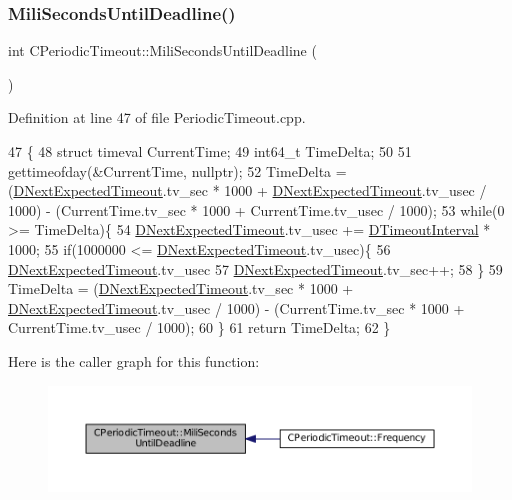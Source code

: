 \subsubsection{\texorpdfstring{Mili\+Seconds\+Until\+Deadline()}{MiliSecondsUntilDeadline()}}
{\footnotesize\ttfamily int C\+Periodic\+Timeout\+::\+Mili\+Seconds\+Until\+Deadline (\begin{DoxyParamCaption}{ }\end{DoxyParamCaption})}



Definition at line 47 of file Periodic\+Timeout.\+cpp.


\begin{DoxyCode}
47                                               \{
48     \textcolor{keyword}{struct }timeval CurrentTime;
49     int64\_t TimeDelta;
50     
51     gettimeofday(&CurrentTime, \textcolor{keyword}{nullptr});
52     TimeDelta = (\hyperlink{classCPeriodicTimeout_ae85c3dd7526ee6b538b7c6478133013c}{DNextExpectedTimeout}.tv\_sec * 1000 + 
      \hyperlink{classCPeriodicTimeout_ae85c3dd7526ee6b538b7c6478133013c}{DNextExpectedTimeout}.tv\_usec / 1000) - (CurrentTime.tv\_sec * 1000 + CurrentTime.tv\_usec
       / 1000);
53     \textcolor{keywordflow}{while}(0 >= TimeDelta)\{
54         \hyperlink{classCPeriodicTimeout_ae85c3dd7526ee6b538b7c6478133013c}{DNextExpectedTimeout}.tv\_usec += \hyperlink{classCPeriodicTimeout_ab0c2b821c02366c9638a66eced3c1f34}{DTimeoutInterval} * 1000;
55         \textcolor{keywordflow}{if}(1000000 <= \hyperlink{classCPeriodicTimeout_ae85c3dd7526ee6b538b7c6478133013c}{DNextExpectedTimeout}.tv\_usec)\{
56             \hyperlink{classCPeriodicTimeout_ae85c3dd7526ee6b538b7c6478133013c}{DNextExpectedTimeout}.tv\_usec %
57             \hyperlink{classCPeriodicTimeout_ae85c3dd7526ee6b538b7c6478133013c}{DNextExpectedTimeout}.tv\_sec++;
58         \}
59         TimeDelta = (\hyperlink{classCPeriodicTimeout_ae85c3dd7526ee6b538b7c6478133013c}{DNextExpectedTimeout}.tv\_sec * 1000 + 
      \hyperlink{classCPeriodicTimeout_ae85c3dd7526ee6b538b7c6478133013c}{DNextExpectedTimeout}.tv\_usec / 1000) - (CurrentTime.tv\_sec * 1000 + CurrentTime.tv\_usec
       / 1000);
60     \}
61     \textcolor{keywordflow}{return} TimeDelta;
62 \}
\end{DoxyCode}
Here is the caller graph for this function\+:\nopagebreak
\begin{figure}[H]
\begin{center}
\leavevmode
\includegraphics[width=350pt]{classCPeriodicTimeout_a5d32d0a29ba5efa718f3489cb9fb2340_icgraph}
\end{center}
\end{figure}


